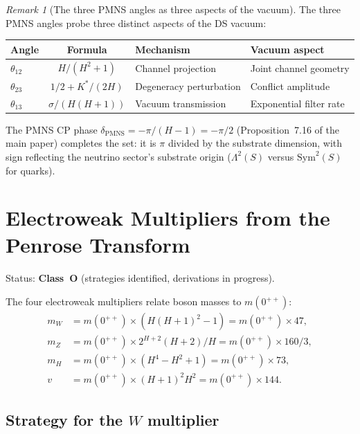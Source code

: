 \documentclass[11pt,a4paper]{article}
\theoremstyle{definition}
\theoremstyle{remark}
\newtheorem{remark}[theorem]{Remark}
\newcommand{\Sym}{\mathrm{Sym}}
\begin{document}
\begin{remark}[The three PMNS angles as three aspects of the vacuum]\label{rem:pmns_triple}
The three PMNS angles probe three distinct aspects of the DS vacuum:
\begin{center}
\begin{tabular}{lcll}
\toprule
Angle & Formula & Mechanism & Vacuum aspect \\
\midrule
$\theta_{12}$ & $H/(H^2+1)$ & Channel projection & Joint channel geometry \\
$\theta_{23}$ & $1/2 + K^*/(2H)$ & Degeneracy perturbation & Conflict amplitude \\
$\theta_{13}$ & $\sigma/(H(H+1))$ & Vacuum transmission & Exponential filter rate \\
\bottomrule
\end{tabular}
\end{center}
The PMNS CP phase $\delta_{\mathrm{PMNS}} = -\pi/(H-1) = -\pi/2$ (Proposition~7.16 of the main paper) completes the set: it is $\pi$ divided by the substrate dimension, with sign reflecting the neutrino sector's substrate origin ($\Lambda^2(S)$ versus $\Sym^2(S)$ for quarks).
\end{remark}


\section{Electroweak Multipliers from the Penrose Transform}\label{sec:ew}

Status: \textbf{Class~O} (strategies identified, derivations in progress).

The four electroweak multipliers relate boson masses to $m(0^{++})$:
\begin{align}
m_W &= m(0^{++}) \times (H(H+1)^2 - 1) = m(0^{++}) \times 47, \\
m_Z &= m(0^{++}) \times 2^{H+2}(H+2)/H = m(0^{++}) \times 160/3, \\
m_H &= m(0^{++}) \times (H^4-H^2+1) = m(0^{++}) \times 73, \\
v   &= m(0^{++}) \times (H+1)^2 H^2 = m(0^{++}) \times 144.
\end{align}

\subsection{Strategy for the $W$ multiplier}\label{sec:W_strategy}
\end{document}
